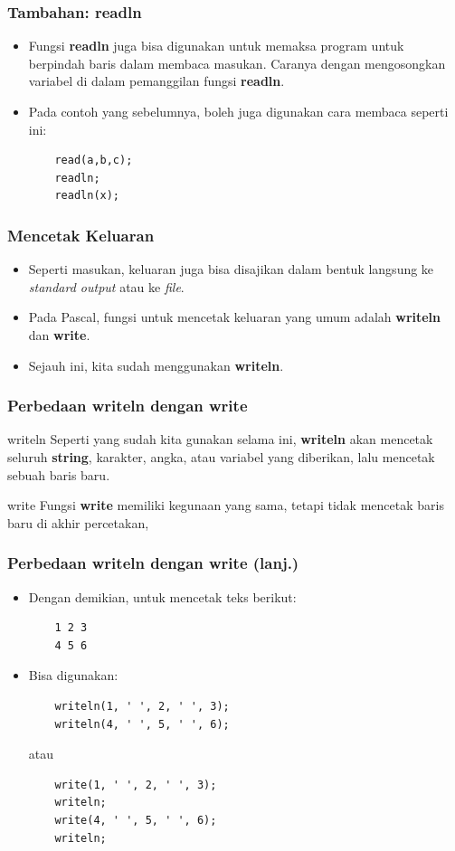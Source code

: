 \documentclass{beamer}
\begin{document}
\begin{frame}[fragile]
\frametitle{Tambahan: readln}
\begin{itemize}
	\item Fungsi \textbf{readln} juga bisa digunakan untuk memaksa program untuk berpindah baris dalam membaca masukan. Caranya dengan mengosongkan variabel di dalam pemanggilan fungsi \textbf{readln}.
	\item Pada contoh yang sebelumnya, boleh juga digunakan cara membaca seperti ini:
	\begin{lstlisting}
	read(a,b,c);
	readln;
	readln(x);
	\end{lstlisting}
\end{itemize}
\end{frame}

\begin{frame}
\frametitle{Mencetak Keluaran}
\begin{itemize}
	\item Seperti masukan, keluaran juga bisa disajikan dalam bentuk langsung ke \textit{standard output} atau ke \textit{file}.
	\item Pada Pascal, fungsi untuk mencetak keluaran yang umum adalah \alert{\textbf{writeln}} dan \alert{\textbf{write}}.
	\item Sejauh ini, kita sudah menggunakan \textbf{writeln}.
\end{itemize}
\end{frame}

\begin{frame}[fragile]
\frametitle{Perbedaan writeln dengan write}
\begin{block}{writeln}
	Seperti yang sudah kita gunakan selama ini, \textbf{writeln} akan mencetak seluruh \textbf{string}, karakter, angka, atau variabel yang diberikan, lalu \alert{mencetak} sebuah baris baru.
\end{block}
\begin{block}{write}
	Fungsi \textbf{write} memiliki kegunaan yang sama, tetapi \alert{tidak mencetak} baris baru di akhir percetakan,
\end{block}
\end{frame}

\begin{frame}[fragile]
\frametitle{Perbedaan writeln dengan write (lanj.)}
\begin{itemize}
	\item Dengan demikian, untuk mencetak teks berikut:
	\begin{lstlisting}
	1 2 3
	4 5 6
	\end{lstlisting}
	\item Bisa digunakan:
	\begin{lstlisting}
	writeln(1, ' ', 2, ' ', 3);
	writeln(4, ' ', 5, ' ', 6);
	\end{lstlisting}
	atau
	\begin{lstlisting}
	write(1, ' ', 2, ' ', 3);
	writeln;
	write(4, ' ', 5, ' ', 6);
	writeln;
	\end{lstlisting}
\end{itemize}
\end{frame}
\end{document}
